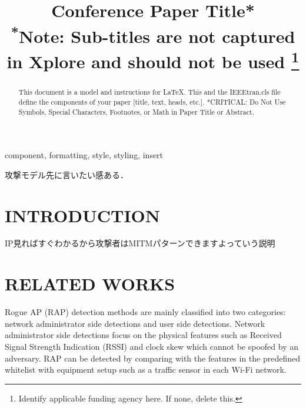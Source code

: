 \documentclass[conference]{IEEEtran}
\begin{document}
\title{Conference Paper Title*\\
{\footnotesize \textsuperscript{*}Note: Sub-titles are not captured in Xplore and
should not be used}
\thanks{Identify applicable funding agency here. If none, delete this.}
}

\author{
\and
{}
\and
{}
\and

}

\maketitle

\begin{abstract}
This document is a model and instructions for \LaTeX.
This and the IEEEtran.cls file define the components of your paper [title, text, heads, etc.]. *CRITICAL: Do Not Use Symbols, Special Characters, Footnotes, 
or Math in Paper Title or Abstract.
\end{abstract}

\begin{IEEEkeywords}
component, formatting, style, styling, insert
\end{IEEEkeywords}
 攻撃モデル先に言いたい感ある．
\section{INTRODUCTION}
IP見ればすぐわかるから攻撃者はMITMパターンできますよっていう説明
\section{RELATED WORKS}
Rogue AP (RAP) detection methods are mainly classified into two categories: network administrator side detections and user side detections.
Network administrator side detections focus on the physical features such as Received Signal Strength Indication (RSSI) and clock skew which cannot be spoofed by an adversary.
RAP can be detected by comparing with the features in the predefined whitelist with equipment setup such as a traffic sensor in each Wi-Fi network.
\end{document}
